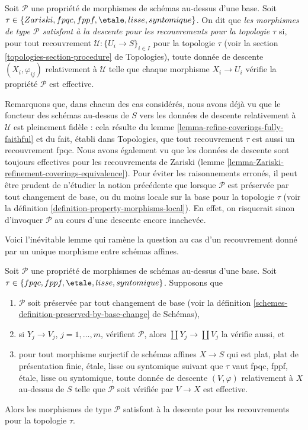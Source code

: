 \begin{definition}
\label{definition-descending-types-morphisms}
Soit $\mathcal{P}$ une propriété de morphismes de schémas au-dessus d'une
base. Soit
$\tau \in \{Zariski, fpqc, fppf, \etale, lisse, syntomique\}$. On dit que
{\it les morphismes de type $\mathcal{P}$ satisfont à la descente pour les
recouvrements pour la topologie $\tau$} si, pour tout recouvrement
$\mathcal{U} : \{U_i \to S\}_{i \in I}$ pour la topologie $\tau$ (voir la
section \ref{topologies-section-procedure} de Topologies), toute donnée de descente
$(X_i, \varphi_{ij})$ relativement à $\mathcal{U}$ telle que chaque morphisme
$X_i \to U_i$ vérifie la propriété $\mathcal{P}$ est effective.
\end{definition}

\noindent
Remarquons que, dans chacun des cas considérés, nous avons déjà vu que le
foncteur des schémas au-dessus de $S$ vers les données de descente relativement
à $\mathcal{U}$ est pleinement fidèle : cela résulte du
lemme \ref{lemma-refine-coverings-fully-faithful} et du fait, établi dans
Topologies, que tout recouvrement $\tau$ est aussi un recouvrement fpqc. Nous
avons également vu que les données de descente sont toujours effectives pour
les recouvrements de Zariski
(lemme \ref{lemma-Zariski-refinement-coverings-equivalence}). Pour éviter les
raisonnements erronés, il peut être prudent de n'étudier la notion précédente
que lorsque $\mathcal{P}$ est préservée par tout changement de base, ou du
moins locale sur la base pour la topologie $\tau$ (voir la
définition \ref{definition-property-morphisms-local}). En effet, on risquerait
sinon d'invoquer $\mathcal{P}$ au cours d'une descente encore inachevée.

\medskip\noindent
Voici l'inévitable lemme qui ramène la question au cas d'un recouvrement donné
par un unique morphisme entre schémas affines.

\begin{lemma}
\label{lemma-descending-types-morphisms}
Soit $\mathcal{P}$ une propriété de morphismes de schémas au-dessus d'une
base. Soit $\tau \in \{fpqc, fppf, \etale, lisse, syntomique\}$. Supposons que
\begin{enumerate}
\item $\mathcal{P}$ soit préservée par tout changement de base (voir la
définition \ref{schemes-definition-preserved-by-base-change} de Schémas),
\item si $Y_j \to V_j$, $j = 1, \ldots, m$, vérifient $\mathcal{P}$, alors
$\coprod Y_j \to \coprod V_j$ la vérifie aussi, et
\item pour tout morphisme surjectif de schémas affines $X \to S$ qui est
plat, plat de présentation finie, \'etale, lisse ou syntomique suivant que
$\tau$ vaut fpqc, fppf, \'etale, lisse ou syntomique, toute donnée de descente
$(V, \varphi)$ relativement à $X$ au-dessus de $S$ telle que $\mathcal{P}$
soit vérifiée par $V \to X$ est effective.
\end{enumerate}
Alors les morphismes de type $\mathcal{P}$ satisfont à la descente pour les
recouvrements pour la topologie $\tau$.
\end{lemma}


